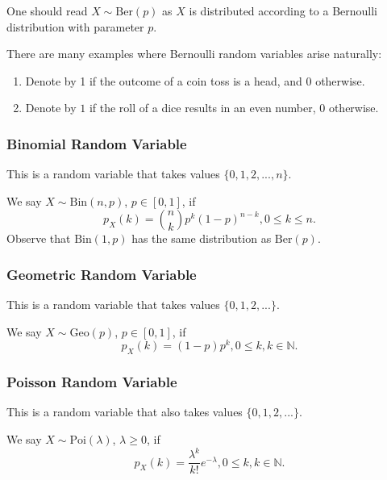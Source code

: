 One should read $X \sim \textrm{Ber}(p)$ as $X$ is distributed according to a Bernoulli distribution with parameter $p$.

There are many examples where Bernoulli random variables arise naturally:
\begin{enumerate}
    \item Denote by 1 if the outcome of a coin toss is a head, and $0$ otherwise.
    \item Denote by $1$ if the roll of a dice results in an even number, $0$ otherwise.
\end{enumerate}

\subsubsection{Binomial Random Variable} This is a random variable that takes  values $\{0,1,2,...,n\}$.

We say $X \sim \textrm{Bin}(n,p)$, $p \in [0,1]$, if
$$ p_X(k)= \binom{n}{k}p^k(1-p)^{n-k},  0\leq k \leq n. $$
Observe that $\textrm{Bin}(1,p)$ has the same distribution as $\textrm{Ber}(p)$.

\subsubsection{Geometric Random Variable} This is a random variable that takes  values $\{0,1,2,...\}$.

We say $X \sim \textrm{Geo}(p)$, $p \in [0,1]$, if
$$ p_X(k)= (1-p) p^{k},  0\leq k, k \in \mathbb{N}. $$

\subsubsection{Poisson Random Variable} This is a random variable that also takes  values $\{0,1,2,...\}$.

We say $X \sim \textrm{Poi}(\lambda)$, $\lambda \geq 0$, if
$$ p_X(k)=  \frac{\lambda^{k}}{k!}e^{-\lambda},  0\leq k, k \in \mathbb{N}. $$
